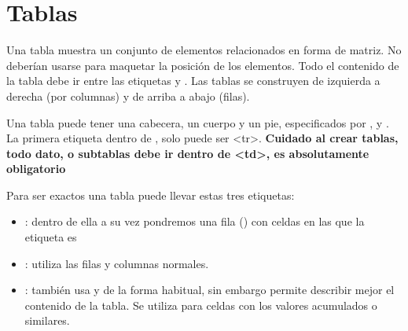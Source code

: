 \documentclass[letterpaper,10pt,spanish]{sphinxmanual}
\begin{document}
\section{Tablas}
\label{tema2:tablas}
Una tabla muestra un conjunto de elementos relacionados en forma de matriz. No deberían usarse para maquetar la posición de los elementos. Todo el contenido de la tabla debe ir entre las etiquetas  y . Las tablas se construyen de izquierda a derecha (por columnas) y de arriba a abajo (filas).

Una tabla puede tener una cabecera, un cuerpo y un pie, especificados por ,  y . La primera etiqueta dentro de , solo puede ser \textless{}tr\textgreater{}. \textbf{Cuidado al crear tablas, todo dato, o subtablas debe ir dentro de \textless{}td\textgreater{}, es absolutamente obligatorio}

Para ser exactos una tabla puede llevar estas tres etiquetas:
\begin{itemize}
\item {} 
: dentro de ella a su vez pondremos una fila () con celdas en las que la etiqueta es 

\item {} 
: utiliza las filas y columnas normales.

\item {} 
: también usa  y  de la forma habitual, sin embargo permite describir mejor el contenido de la tabla. Se utiliza para celdas con los valores acumulados o similares.

\end{itemize}
\end{document}
